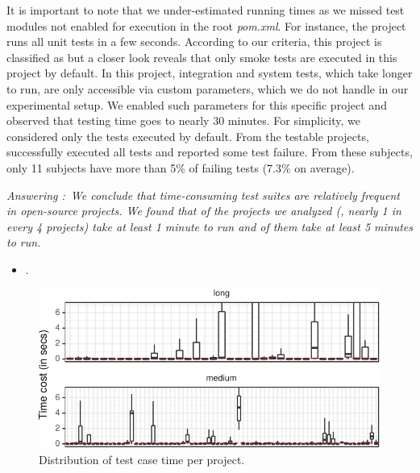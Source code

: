 \documentclass[10pt,journal,compsoc]{IEEEtran}
\begin{document}
It is important to note that we under-estimated running times as we missed test modules not enabled for
execution in the root \emph{pom.xml}. For instance, the project 
runs all unit tests in a few seconds.  According to our criteria, this
project is classified as \shortg{} but a closer look reveals
that only smoke tests are executed in this project by default.
In this project, integration and system tests, which take longer to run, are only accessible via
custom parameters, which we do not handle in our experimental setup.
We enabled such parameters for this specific project and observed that
testing time goes to nearly 30 minutes.  For simplicity, we considered
only the tests executed by default.
From the \numSubjs{} testable projects, \numSubjsPass{} successfully
executed all tests and \numSubjsFail{} reported some test failure.
From these \numSubjsFail{} subjects, only 11 subjects
have more than 5\% of failing tests (7.3\% on average).
\begin{mdframed}
\noindent\textit{Answering \numRQFeasibilityOne{}:}~\emph{We conclude that
    time-consuming test suites are relatively frequent in
    open-source projects.  We found that \percentMedLongRunning{} of
    the \numSubjs{} projects we analyzed (\ie{}, nearly 1 in every 4
    projects) take at least 1 minute to run and
    \percentLongRunning{} of them take at least 5 minutes to run.}
\end{mdframed}

\begin{itemize}
  \item \numRQFeasibilityTwo. \textbf{\RQFeasibilityTwo}
\end{itemize}

\begin{figure}[t!]
  \centering
  \includegraphics[width=.48\textwidth]{results/testcost-distribution.pdf}
  \vspace{-2mm}
  \caption{\label{fig:time-distributions}Distribution of test case time per project.}%
  \vspace{-5mm}
\end{figure}
\end{document}
